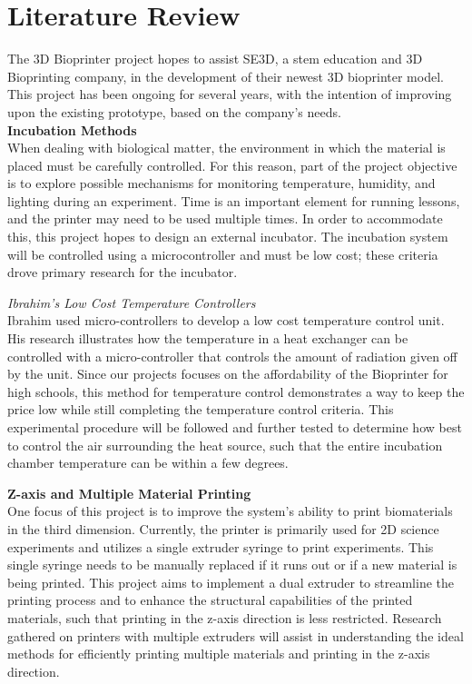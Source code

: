 \section{Literature Review}

The 3D Bioprinter project hopes to assist SE3D, a stem education and 3D Bioprinting company, in the development of their newest 3D bioprinter model. This project has been ongoing for several years, with the intention of improving upon the existing prototype, based on the company’s needs. 
\\
\textbf{Incubation Methods}
\\
When dealing with biological matter, the environment in which the material is placed must be carefully controlled. For this reason, part of the project objective is to explore possible mechanisms for monitoring temperature, humidity, and lighting during an experiment. Time is an important element for running lessons, and the printer may need to be used multiple times. In order to accommodate this, this project hopes to design an external incubator. The incubation system will be controlled using a microcontroller and must be low cost; these criteria drove primary research for the incubator.
\\
\begin{adjustwidth}{2.5em}{0pt}

\textit{Ibrahim’s Low Cost Temperature Controllers}
\\
Ibrahim used micro-controllers to develop a low cost temperature control unit. His research illustrates how the temperature in a heat exchanger can be controlled with a micro-controller that controls the amount of radiation given off by the unit.  Since our projects focuses on the affordability of the Bioprinter for high schools, this method for temperature control demonstrates a way to keep the price low while still completing the temperature control criteria. This experimental procedure will be followed and further tested to determine how best to control the air surrounding the heat source, such that the entire incubation chamber temperature can be within a few degrees.
\\
\end{adjustwidth}
\textbf{Z-axis and Multiple Material Printing}
\\
One focus of this project is to improve the system’s ability to print biomaterials in the third dimension. Currently, the printer is primarily used for 2D science experiments and utilizes a single extruder syringe to print experiments. This single syringe needs to be manually replaced if it runs out or if a new material is being printed. This project aims to implement a dual extruder to streamline the printing process and to enhance the structural capabilities of the printed materials, such that printing in the z-axis direction is less restricted. Research gathered on printers with multiple extruders will assist in understanding the ideal methods for efficiently printing multiple materials and printing in the z-axis direction.

